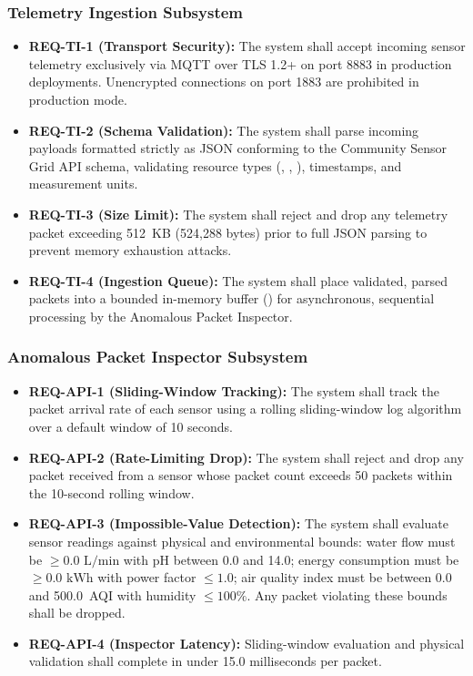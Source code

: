 \documentclass[a4paper]{article}
\begin{document}
\subsubsection{Telemetry Ingestion Subsystem}
\begin{itemize}
    \item \textbf{REQ-TI-1 (Transport Security):} The system shall accept incoming sensor telemetry exclusively via MQTT over TLS 1.2+ on port 8883 in production deployments. Unencrypted connections on port 1883 are prohibited in production mode.
    \item \textbf{REQ-TI-2 (Schema Validation):} The system shall parse incoming payloads formatted strictly as JSON conforming to the Community Sensor Grid API schema, validating resource types (, , ), timestamps, and measurement units.
    \item \textbf{REQ-TI-3 (Size Limit):} The system shall reject and drop any telemetry packet exceeding 512~KB (524,288 bytes) prior to full JSON parsing to prevent memory exhaustion attacks.
    \item \textbf{REQ-TI-4 (Ingestion Queue):} The system shall place validated, parsed packets into a bounded in-memory buffer () for asynchronous, sequential processing by the Anomalous Packet Inspector.
\end{itemize}

\subsubsection{Anomalous Packet Inspector Subsystem}
\begin{itemize}
    \item \textbf{REQ-API-1 (Sliding-Window Tracking):} The system shall track the packet arrival rate of each sensor using a rolling sliding-window log algorithm over a default window of 10 seconds.
    \item \textbf{REQ-API-2 (Rate-Limiting Drop):} The system shall reject and drop any packet received from a sensor whose packet count exceeds 50 packets within the 10-second rolling window.
    \item \textbf{REQ-API-3 (Impossible-Value Detection):} The system shall evaluate sensor readings against physical and environmental bounds: water flow must be $\ge 0.0\text{ L/min}$ with pH between 0.0 and 14.0; energy consumption must be $\ge 0.0\text{ kWh}$ with power factor $\le 1.0$; air quality index must be between 0.0 and 500.0~AQI with humidity $\le 100\%$. Any packet violating these bounds shall be dropped.
    \item \textbf{REQ-API-4 (Inspector Latency):} Sliding-window evaluation and physical validation shall complete in under 15.0 milliseconds per packet.
\end{itemize}
\end{document}
